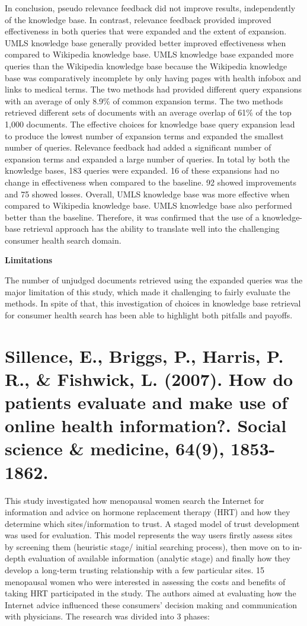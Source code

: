 \documentclass[]{article}
\begin{document}
In conclusion, pseudo relevance feedback did not improve results, independently of the knowledge base. In contrast, relevance feedback provided improved effectiveness in both queries that were expanded and the extent of expansion. UMLS knowledge base generally provided better improved effectiveness when compared to Wikipedia knowledge base. UMLS knowledge base expanded more queries than the Wikipedia knowledge base because the Wikipedia knowledge base was comparatively incomplete by only having pages with health infobox and links to medical terms. The two methods had provided different query expansions with an average of only 8.9\% of common expansion terms. The two methods retrieved different sets of documents with an average overlap of 61\% of the top 1,000 documents.  The effective choices for knowledge base query expansion lead to produce the lowest number of expansion terms and expanded the smallest number of queries. Relevance feedback had added a significant number of expansion terms and expanded a large number of queries.  In total by both the knowledge bases, 183 queries were expanded. 16 of these expansions had no change in effectiveness when compared to the baseline. 92 showed improvements and 75 showed losses. Overall, UMLS knowledge base was more effective when compared to Wikipedia knowledge base. UMLS knowledge base also performed better than the baseline. Therefore, it was confirmed that the use of a knowledge-base retrieval approach has the ability to translate well into the challenging consumer health search domain.                 

\textbf{Limitations}

The number of unjudged documents retrieved using the expanded queries was the major limitation of this study, which made it challenging to fairly evaluate the methods. In spite of that, this investigation of choices in knowledge base retrieval for consumer health search has been able to highlight both pitfalls and payoffs.

\section{Sillence, E., Briggs, P., Harris, P. R., \& Fishwick, L. (2007). How do patients evaluate and make use of online health information?. Social science \& medicine, 64(9), 1853-1862.} 

This study investigated how menopausal women search the Internet for information and advice on hormone replacement therapy (HRT) and how they determine which sites/information to trust. A staged model of trust development was used for evaluation. This model represents the way users firstly assess sites by screening them (heuristic stage/ initial searching process), then move on to in-depth evaluation of available information (analytic stage) and finally how they develop a long-term trusting relationship with a few particular sites. 15 menopausal women who were interested in assessing the costs and benefits of taking HRT participated in the study. The authors aimed at evaluating how the Internet advice influenced these consumers' decision making and communication with physicians. The research was divided into 3 phases:
\end{document}
